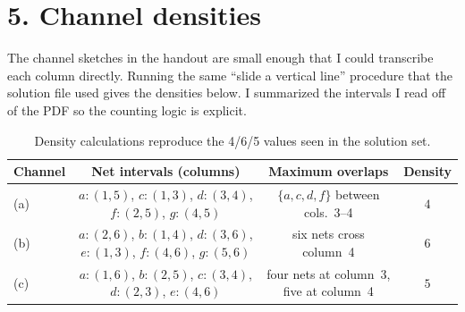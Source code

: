 \documentclass[11pt]{article}
\begin{document}
\section*{5. Channel densities}
The channel sketches in the handout are small enough that I could transcribe each column directly. Running the same ``slide a vertical line'' procedure that the solution file used gives the densities below. I summarized the intervals I read off of the PDF so the counting logic is explicit.
\begin{table}[h]
  \centering
  \begin{tabular}{@{}lccc@{}}\toprule
  Channel & Net intervals (columns) & Maximum overlaps & Density \\\midrule
  (a) & $a:(1,5)$, $c:(1,3)$, $d:(3,4)$, $f:(2,5)$, $g:(4,5)$ & $\{a,c,d,f\}$ between cols.~3--4 & $4$ \\
  (b) & $a:(2,6)$, $b:(1,4)$, $d:(3,6)$, $e:(1,3)$, $f:(4,6)$, $g:(5,6)$ & six nets cross column~4 & $6$ \\
  (c) & $a:(1,6)$, $b:(2,5)$, $c:(3,4)$, $d:(2,3)$, $e:(4,6)$ & four nets at column~3, five at column~4 & $5$ \\\bottomrule
  \end{tabular}
  \caption{Density calculations reproduce the 4/6/5 values seen in the solution set.}
\end{table}
\end{document}

